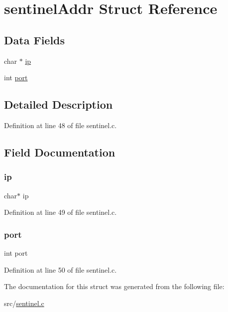 \hypertarget{structsentinel_addr}{}\section{sentinel\+Addr Struct Reference}
\label{structsentinel_addr}
\subsection*{Data Fields}
\begin{DoxyCompactItemize}
\item 
char $\ast$ \hyperlink{structsentinel_addr_afbc356cd0e25d1dbbece7c10fd025fa6}{ip}
\item 
int \hyperlink{structsentinel_addr_a63c89c04d1feae07ca35558055155ffb}{port}
\end{DoxyCompactItemize}


\subsection{Detailed Description}


Definition at line 48 of file sentinel.\+c.



\subsection{Field Documentation}
\mbox{\label{structsentinel_addr_afbc356cd0e25d1dbbece7c10fd025fa6}} 
\subsubsection{\texorpdfstring{ip}{ip}}
{\footnotesize\ttfamily char$\ast$ ip}



Definition at line 49 of file sentinel.\+c.

\mbox{\label{structsentinel_addr_a63c89c04d1feae07ca35558055155ffb}} 
\subsubsection{\texorpdfstring{port}{port}}
{\footnotesize\ttfamily int port}



Definition at line 50 of file sentinel.\+c.



The documentation for this struct was generated from the following file\+:\begin{DoxyCompactItemize}
\item 
src/\hyperlink{sentinel_8c}{sentinel.\+c}\end{DoxyCompactItemize}
